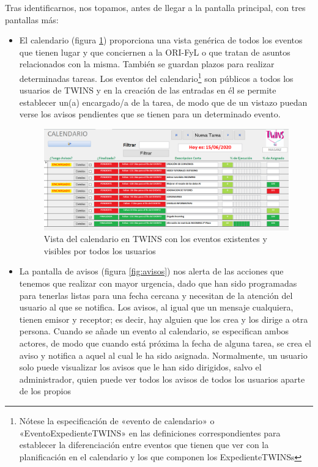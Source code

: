 Tras identificarnos, nos topamos, antes de llegar a la pantalla principal, con tres pantallas más:

\begin{itemize}
	\item El calendario (figura \ref{fig:calendario}) proporciona una vista genérica de todos los eventos que tienen lugar y que conciernen a la ORI-FyL o que tratan de asuntos relacionados con la misma. También se guardan plazos para realizar determinadas tareas. Los eventos del calendario\footnote{Nótese la especificación de «evento de calendario» o «\gls{EventoExpedienteTWINS}» en las definiciones correspondientes para establecer la diferenciación entre eventos que tienen que ver con la planificación en el calendario y los que componen los \glspl{ExpedienteTWINS}} son públicos a todos los usuarios de TWINS y en la creación de las entradas en él se permite establecer un(a) encargado/a de la tarea, de modo que de un vistazo puedan verse los avisos pendientes que se tienen para un determinado evento.
	
	\begin{figure}
		\includegraphics[width=\textwidth]{img/Capturas de TWINS/calendario.png}
		\caption[Calendario de TWINS]{Vista del calendario en TWINS con los eventos existentes y visibles por todos los usuarios}
		\label{fig:calendario}
	\end{figure}
	
	
	\item La pantalla de avisos (figura \ref{fig:avisos}) nos alerta de las acciones que tenemos que realizar con mayor urgencia, dado que han sido programadas para tenerlas listas para una fecha cercana y necesitan de la atención del usuario al que se notifica. Los avisos, al igual que un mensaje cualquiera, tienen emisor y receptor; es decir, hay alguien que los crea y los dirige a otra persona. Cuando se añade un evento al calendario, se especifican ambos actores, de modo que cuando está próxima la fecha de alguna tarea, se crea el aviso y notifica a aquel al cual le ha sido asignada. Normalmente, un usuario solo puede visualizar los avisos que le han sido dirigidos, salvo el administrador, quien puede ver todos los avisos de todos los usuarios aparte de los propios
	

\end{itemize}
